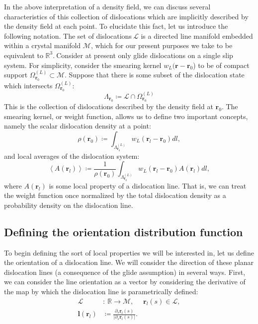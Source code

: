 In the above interpretation of a density field, we can discuss several
characteristics of this collection of dislocations which are implicitly
described by the density field at each point. To elucidate this fact, let
us introduce the following notation. The set of
dislocations\(\mathcal{\ L}\) is a directed line manifold embedded
within a crystal manifold \(\mathcal{M}\), which for our present
purposes we take to be equivalent to \(\mathbb{R}^{3}.\ \)Consider at
present only glide dislocations on a single slip system. For simplicity,
consider the smearing kernel \(w_{L}(\boldsymbol{r -}\boldsymbol{r}_{0}\)) to be
of compact support \(\Omega_{\boldsymbol{r}_{0}}^{(L)}\mathcal{\subset M}\).
Suppose that there is some subset of the dislocation state which
intersects \(\Omega_{\boldsymbol{r}_{0}}^{(L)}\):
\begin{equation}\Lambda_{\boldsymbol{r}_{0}}\coloneqq\mathcal{L}\cap\Omega_{\boldsymbol{r}_{0}}^{(L)}\end{equation}
This is the collection of dislocations described by the density field at
\(\boldsymbol{r}_{0}\). The smearing kernel, or weight function, allows us
to define two important concepts, namely the scalar dislocation density
at a point:
\begin{equation}\rho( \boldsymbol{r}_{0} )\coloneqq\int_{\Lambda_{\boldsymbol{r}_{0}}^{(L)}}^{}{w_{L}\left( \boldsymbol{r}_{l}-\boldsymbol{r}_{0} \right)dl},\end{equation}
and local averages of the dislocation system:
\begin{equation}
\left\langle A(\boldsymbol{r}_l)\right\rangle \coloneqq \frac{1}{\rho(\boldsymbol{r}_0)}\int_{\Lambda_{\boldsymbol{r}_{0}}^{(L)}}^{}{w_{L}\left( \boldsymbol{r}_{l}-\boldsymbol{r}_{0} \right) A(\boldsymbol{r}_l) dl},\end{equation}
where \(A\left( \boldsymbol{r}_{l} \right)\) is some local property of a dislocation line. That is, we can treat the weight function once normalized by the total dislocation density as a probability density on the dislocation line.

\subsection{Defining the orientation distribution
function}

To begin defining the sort of local properties we will be interested in, let us define the orientation of a dislocation line. We will consider the direction of these planar dislocation lines (a consequence of the glide assumption) in several ways. First, we can consider the line orientation as a vector by considering the derivative of the map by which the dislocation line is parametrically defined:
\begin{subequations}
\begin{align}
    \mathcal{L} &\colon\ \mathbb{R}\to\mathcal{M}, & \boldsymbol{r}_l(s) \in \mathcal{L},\\
    \boldsymbol{l}(\boldsymbol{r}_l)&\coloneqq \frac{\partial_s\boldsymbol{r}_l(s)}{\vert\partial_s\boldsymbol{r}_l(s)\vert}.
\end{align}
\end{subequations}

